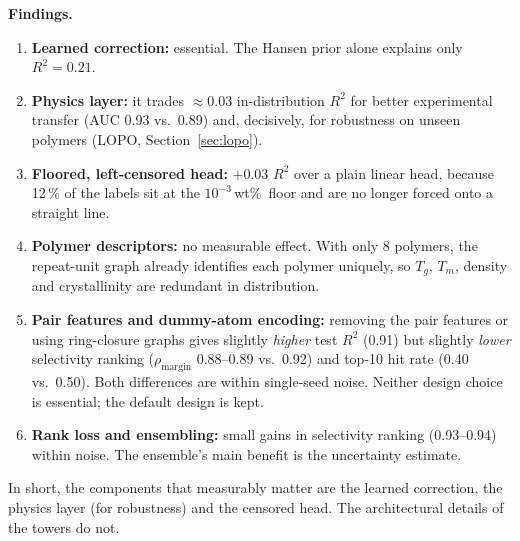 \documentclass[11pt,a4paper]{article}
\newcommand{\wt}{wt\%}
\begin{document}
\textbf{Findings.}
\begin{enumerate}
\item \textbf{Learned correction:} essential. The Hansen prior alone explains only $R^2=0.21$.
\item \textbf{Physics layer:} it trades $\approx0.03$ in-distribution $R^2$ for better experimental
transfer (AUC 0.93 vs.\ 0.89) and, decisively, for robustness on unseen polymers (LOPO,
Section~\ref{sec:lopo}).
\item \textbf{Floored, left-censored head:} $+0.03$ $R^2$ over a plain linear head, because 12\,\% of
the labels sit at the $10^{-3}$\,\wt\ floor and are no longer forced onto a straight line.
\item \textbf{Polymer descriptors:} no measurable effect. With only 8 polymers, the repeat-unit graph
already identifies each polymer uniquely, so $T_g$, $T_m$, density and crystallinity are redundant in
distribution.
\item \textbf{Pair features and dummy-atom encoding:} removing the pair features or using ring-closure
graphs gives slightly \emph{higher} test $R^2$ (0.91) but slightly \emph{lower} selectivity ranking
($\rho_{\text{margin}}$ 0.88--0.89 vs.\ 0.92) and top-10 hit rate (0.40 vs.\ 0.50). Both differences are
within single-seed noise. Neither design choice is essential; the default design is kept.
\item \textbf{Rank loss and ensembling:} small gains in selectivity ranking (0.93--0.94) within noise. The
ensemble's main benefit is the uncertainty estimate.
\end{enumerate}
In short, the components that measurably matter are the learned correction, the physics layer (for
robustness) and the censored head. The architectural details of the towers do not.
\end{document}

